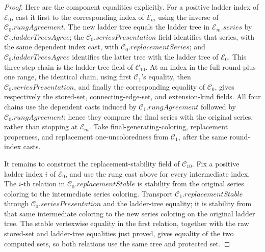 \begin{proof}
Here are the component equalities explicitly.  For a positive ladder
index of \(\mathcal E_0\), cast it first to the corresponding index of
\(\mathcal E_m\) using the inverse of
\(\mathcal C_0.\mathit{rungAgreement}\).  The new ladder tree equals the
ladder tree in \(\mathcal E_m.\mathit{series}\) by
\(\mathcal C_1.\mathit{ladderTreesAgree}\); the
\(\mathcal C_0.\mathit{seriesPresentation}\) field identifies that series,
with the same dependent index cast, with
\(\mathcal C_0.\mathit{replacementSeries}\); and
\(\mathcal C_0.\mathit{ladderTreesAgree}\) identifies the latter tree with
the ladder tree of \(\mathcal E_0\).  This three-step chain is the
ladder-tree field of \(\mathcal C_{10}\).  At an index in the full
round-plus-one range, the identical chain, using first
\(\mathcal C_1\)'s equality, then
\(\mathcal C_0.\mathit{seriesPresentation}\), and finally the corresponding
equality of \(\mathcal C_0\), gives respectively the stored-set,
connecting-edge-set, and extension-kind fields.  All four chains use the
dependent casts induced by
\(\mathcal C_1.\mathit{rungAgreement}\) followed by
\(\mathcal C_0.\mathit{rungAgreement}\); hence they compare the final
series with the original series, rather than stopping at
\(\mathcal E_m\).  Take final-generating-coloring, replacement properness,
and replacement one-uncoloredness from \(\mathcal C_1\), after the same
round-index casts.

It remains to construct the replacement-stability field of
\(\mathcal C_{10}\).  Fix a positive ladder index \(i\) of
\(\mathcal E_0\), and use the rung cast above for every intermediate
index.  The \(i\)-th relation in
\(\mathcal C_0.\mathit{replacementStable}\) is stability from the original
series coloring to the intermediate series coloring.  Transport
\(\mathcal C_1.\mathit{replacementStable}\) through
\(\mathcal C_0.\mathit{seriesPresentation}\) and the ladder-tree equality;
it is stability from that same intermediate coloring to the new series
coloring on the original ladder tree.  The stable vertexwise equality in
the first relation, together with the raw stored-set and ladder-tree
equalities just proved, gives equality of the two computed
 sets, so both relations use the same tree
and protected set.


\end{proof}

